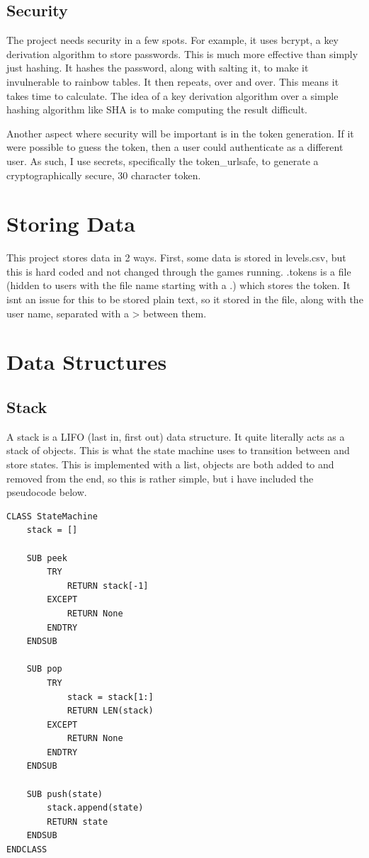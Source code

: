 \subsection{Security}
The project needs security in a few spots. For example, it uses bcrypt, a key derivation algorithm to store passwords. This is much more effective than simply just hashing. It hashes the password, along with salting it, to make it invulnerable to rainbow tables. It then repeats, over and over. This means it takes time to calculate. The idea of a key derivation algorithm over a simple hashing algorithm like SHA is to make computing the result difficult. 

Another aspect where security will be important is in the token generation. If it were possible to guess the token, then a user could authenticate as a different user. As such, I use secrets, specifically the token\_urlsafe, to generate a cryptographically secure, 30 character token. 

\section{Storing Data}
This project stores data in 2 ways. First, some data is stored in levels.csv, but this is hard coded and not changed through the games running. .tokens is a file (hidden to users with the file name starting with a .) which stores the token. It isnt an issue for this to be stored plain text, so it stored in the file, along with the user name, separated with a > between them.
\section{Data Structures}

\subsection{Stack}
A stack is a LIFO (last in, first out) data structure. It quite literally acts as a stack of objects. This is what the state machine uses to transition between and store states. This is implemented with a list, objects are both added to and removed from the end, so this is rather simple, but i have included the pseudocode below. 

\begin{lstlisting}
CLASS StateMachine
    stack = []
    
    SUB peek
        TRY
            RETURN stack[-1]
        EXCEPT
            RETURN None
        ENDTRY
    ENDSUB
    
    SUB pop
        TRY
            stack = stack[1:]
            RETURN LEN(stack)
        EXCEPT
            RETURN None
        ENDTRY
    ENDSUB
    
    SUB push(state)
        stack.append(state)
        RETURN state
    ENDSUB
ENDCLASS
\end{lstlisting}
